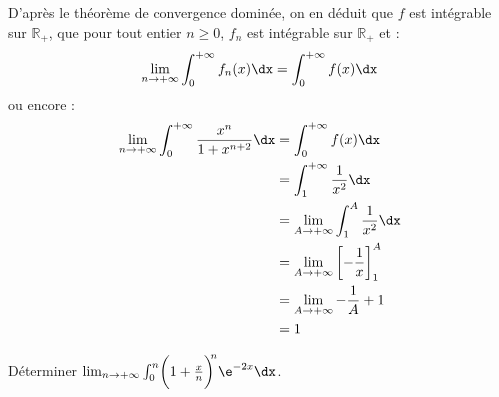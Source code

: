 \documentclass[a4paper,10pt]{report}
\begin{document}
D'après le théorème de convergence dominée, on en déduit que $f$ est intégrable sur $\mathbb{R}_+$, que pour tout entier $n \geq 0$, $f_n$ est intégrable sur $\mathbb{R}_+$ et :
$$ \lim_{n \rightarrow + \infty} \int_0^{+ \infty} f_n(x) \dx = \int_0^{+ \infty} f(x) \dx$$
ou encore :
\begin{align*}
\lim_{n \rightarrow + \infty} \int_0^{+ \infty} \dfrac{x^n}{1+x^{n+2}} \dx & = \int_0^{+ \infty} f(x) \dx \\
& = \int_1^{+ \infty} \dfrac{1}{x^2} \dx \\
& = \lim_{A \rightarrow + \infty} \int_1^{A} \dfrac{1}{x^2} \dx \\
& = \lim_{A \rightarrow + \infty} \left[ - \dfrac{1}{x} \right]_1^A \\
& = \lim_{A \rightarrow + \infty} - \dfrac{1}{A} + 1 \\
& = 1
\end{align*}



\begin{Exa} Déterminer $\lim_{n \to + \infty} \int_{0}^{n} \biggl( 1 + \frac{x}{n} \biggr)^{\!\!n} \e^{ - 2x} \dx$.
\end{Exa}
\end{document}
